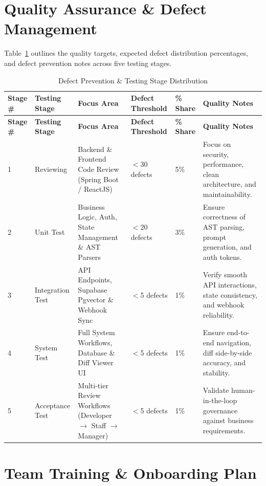 \section{Quality Assurance \& Defect Management}

Table~\ref{tab:defect} outlines the quality targets, expected defect distribution
percentages, and defect prevention notes across five testing stages.

\begin{footnotesize}
\begin{longtable}{|p{1.1cm}|p{2.3cm}|p{2.6cm}|p{1.6cm}|p{1.1cm}|p{3cm}|}
\caption{Defect Prevention \& Testing Stage Distribution}\label{tab:defect}\\
\hline
\hline
\textbf{Stage \#} & \textbf{Testing Stage} & \textbf{Focus Area} & \textbf{Defect Threshold} & \textbf{\% Share} & \textbf{Quality Notes} \\
\hline
\hline
\endfirsthead
\hline
\textbf{Stage \#} & \textbf{Testing Stage} & \textbf{Focus Area} & \textbf{Defect Threshold} & \textbf{\% Share} & \textbf{Quality Notes} \\
\hline
\hline
\endhead
1 & Reviewing & Backend \& Frontend Code Review (Spring Boot / ReactJS) & $<$30 defects & 5\% & Focus on security, performance, clean architecture, and maintainability. \\
\hline
2 & Unit Test & Business Logic, Auth, State Management \& AST Parsers & $<$20 defects & 3\% & Ensure correctness of AST parsing, prompt generation, and auth tokens. \\
\hline
3 & Integration Test & API Endpoints, Supabase Pgvector \& Webhook Sync & $<$5 defects & 1\% & Verify smooth API interactions, state consistency, and webhook reliability. \\
\hline
4 & System Test & Full System Workflows, Database \& Diff Viewer UI & $<$5 defects & 1\% & Ensure end-to-end navigation, diff side-by-side accuracy, and stability. \\
\hline
5 & Acceptance Test & Multi-tier Review Workflows (Developer $\rightarrow$ Staff $\rightarrow$ Manager) & $<$5 defects & 1\% & Validate human-in-the-loop governance against business requirements. \\
\hline
\hline
\end{longtable}
\end{footnotesize}

\section{Team Training \& Onboarding Plan}

